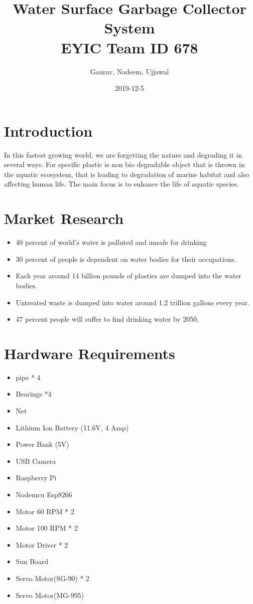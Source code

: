 \documentclass{article}
\title{ Water Surface Garbage Collector System 
\linebreak
\\
\large EYIC Team ID 678
}
\date{2019-12-5}
\author{Gaurav, Nadeem, Ujjawal}
\begin{document}
\maketitle
{}

\newpage
\section{Introduction}
In this fastest growing world, we are forgetting the nature and degrading it in several ways. 
For specific plastic is non bio degradable object that is thrown in the aquatic ecosystem, that is leading to degradation of marine habitat and also affecting human life. The main focus is to enhance the life of aquatic species.
\linebreak
\linebreak

\section{Market Research}
\begin{itemize}
	\item 40 percent of world’s water is polluted and unsafe for drinking
	\item 30 percent of people is dependent on water bodies for their occupations.
	\item Each year around 14 billion pounds of plastics are dumped into the water bodies.
	\item Untreated waste is dumped into water around 1.2 trillion gallons every year.
	\item 47 percent people will suffer to find drinking water by 2050.
\linebreak
\linebreak
\end{itemize}


\section{Hardware Requirements}
\begin{itemize}
	
	\item pipe * 4
	\item Bearings *4
	\item Net
	\item Lithium Ion Battery (11.6V, 4 Amp)
	\item Power Bank (5V)
	\item USB Camera
	\item Raspberry Pi
	\item Nodemcu Esp8266
	\item Motor 60 RPM * 2
	\item Motor 100 RPM * 2
	\item Motor Driver * 2
	\item Sun Board
	\item Servo Motor(SG-90) * 2
	\item Servo Motor(MG-995)
\newline
\newline
\end{itemize}
\end{document}
